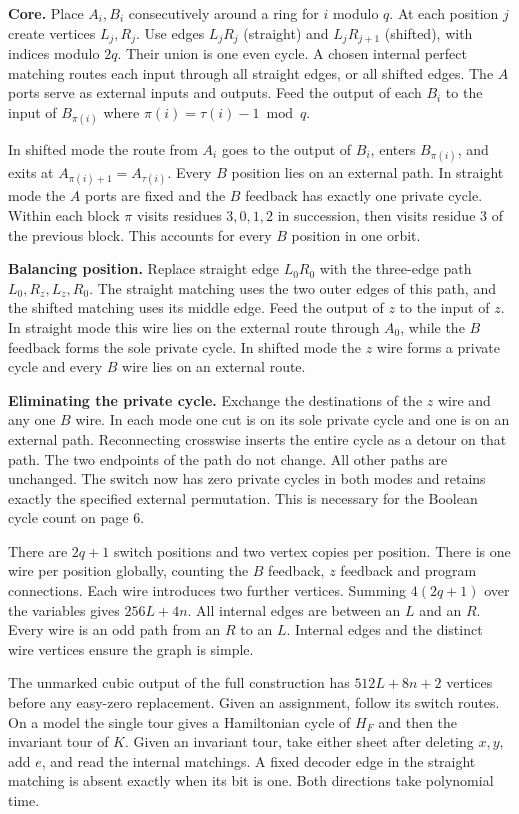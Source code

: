 \documentclass[11pt,letterpaper]{article}
\newcommand{\hd}[1]{\par\medskip{\large\bfseries\color{pine}#1}\par\nobreak}
\newcommand{\lead}[1]{\textbf{\color{ink}#1}\enspace}
\begin{document}
\lead{Core.} Place $A_i,B_i$ consecutively around a ring for $i$ modulo $q$. At each position $j$ create vertices $L_j,R_j$. Use edges $L_jR_j$ (straight) and $L_jR_{j+1}$ (shifted), with indices modulo $2q$. Their union is one even cycle. A chosen internal perfect matching routes each input through all straight edges, or all shifted edges. The $A$ ports serve as external inputs and outputs. Feed the output of each $B_i$ to the input of $B_{\pi(i)}$ where $\pi(i)=\tau(i)-1\bmod q$.

In shifted mode the route from $A_i$ goes to the output of $B_i$, enters $B_{\pi(i)}$, and exits at $A_{\pi(i)+1}=A_{\tau(i)}$. Every $B$ position lies on an external path. In straight mode the $A$ ports are fixed and the $B$ feedback has exactly one private cycle. Within each block $\pi$ visits residues $3,0,1,2$ in succession, then visits residue 3 of the previous block. This accounts for every $B$ position in one orbit.

\lead{Balancing position.} Replace straight edge $L_0R_0$ with the three-edge path $L_0,R_z,L_z,R_0$. The straight matching uses the two outer edges of this path, and the shifted matching uses its middle edge. Feed the output of $z$ to the input of $z$. In straight mode this wire lies on the external route through $A_0$, while the $B$ feedback forms the sole private cycle. In shifted mode the $z$ wire forms a private cycle and every $B$ wire lies on an external route.

\lead{Eliminating the private cycle.} Exchange the destinations of the $z$ wire and any one $B$ wire. In each mode one cut is on its sole private cycle and one is on an external path. Reconnecting crosswise inserts the entire cycle as a detour on that path. The two endpoints of the path do not change. All other paths are unchanged. The switch now has zero private cycles in both modes and retains exactly the specified external permutation. This is necessary for the Boolean cycle count on page 6.

\hd{Size and reconstruction}
There are $2q+1$ switch positions and two vertex copies per position. There is one wire per position globally, counting the $B$ feedback, $z$ feedback and program connections. Each wire introduces two further vertices. Summing $4(2q+1)$ over the variables gives $256L+4n$. All internal edges are between an $L$ and an $R$. Every wire is an odd path from an $R$ to an $L$. Internal edges and the distinct wire vertices ensure the graph is simple.

The unmarked cubic output of the full construction has $512L+8n+2$ vertices before any easy-zero replacement. Given an assignment, follow its switch routes. On a model the single tour gives a Hamiltonian cycle of $H_F$ and then the invariant tour of $K$. Given an invariant tour, take either sheet after deleting $x,y$, add $e$, and read the internal matchings. A fixed decoder edge in the straight matching is absent exactly when its bit is one. Both directions take polynomial time.
\end{document}
